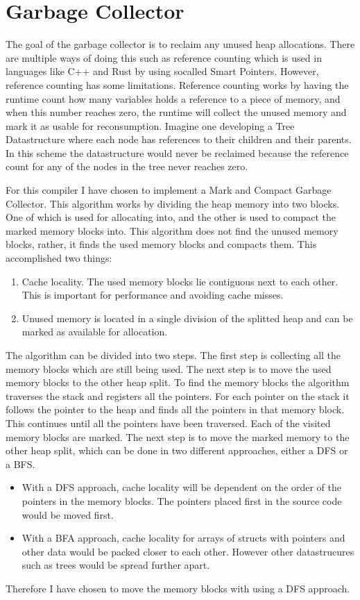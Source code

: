 \section*{Garbage Collector} 
The goal of the garbage collector is to reclaim any unused heap allocations. There are multiple ways of doing this such as reference counting which is used in languages like C++ and Rust by using socalled Smart Pointers. However, reference counting has some limitations. Reference counting works by having the runtime count how many variables holds a reference to a piece of memory, and when this number reaches zero, the runtime will collect the unused memory and mark it as usable for reconsumption. Imagine one developing a Tree Datastructure where each node has references to their children and their parents. In this scheme the datastructure would never be reclaimed because the reference count for any of the nodes in the tree never reaches zero. 

For this compiler I have chosen to implement a Mark and Compact Garbage Collector. This algorithm works by dividing the heap memory into two blocks. One of which is used for allocating into, and the other is used to compact the marked memory blocks into. This algorithm does not find the unused memory blocks, rather, it finds the used memory blocks and compacts them. This accomplished two things: 
\begin{enumerate}
    \item Cache locality. The used memory blocks lie contiguous next to each other. This is important for performance and avoiding cache misses.
    \item Unused memory is located in a single division of the splitted heap and can be marked as available for allocation. 
\end{enumerate}
The algorithm can be divided into two steps. The first step is collecting all the memory blocks which are still being used. The next step is to move the used memory blocks to the other heap split.
To find the memory blocks the algorithm traverses the stack and registers all the pointers. For each pointer on the stack it follows the pointer to the heap and finds all the pointers in that memory block. This continues until all the pointers have been traversed. Each of the visited memory blocks are marked. The next step is to move the marked memory to the other heap split, which can be done in two different approaches, either a DFS or a BFS. 

\begin{itemize}
    \item With a DFS approach, cache locality will be dependent on the order of the pointers in the memory blocks. The pointers placed first in the source code would be moved first.
    \item With a BFA approach, cache locality for arrays of structs with pointers and other data would be packed closer to each other. However other datastrucures such as trees would be spread further apart.
\end{itemize}
Therefore I have chosen to move the memory blocks with using a DFS approach. 

